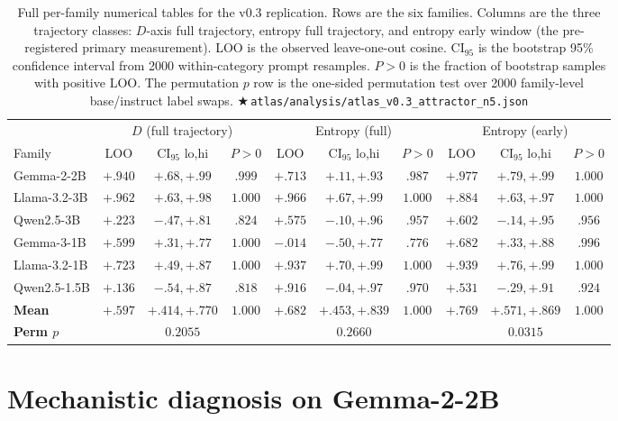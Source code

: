\documentclass[11pt,letterpaper]{article}
\newcommand{\repro}[1]{%
  \textcolor{fathomgreen}{\footnotesize$\bigstar$\,\texttt{#1}}}
\begin{document}
\begin{table}[h]
\centering
\scriptsize
\begin{tabular}{lccccccccc}
\toprule
 & \multicolumn{3}{c}{$D$ (full trajectory)} & \multicolumn{3}{c}{Entropy (full)} & \multicolumn{3}{c}{Entropy (early)} \\
\cmidrule(lr){2-4}\cmidrule(lr){5-7}\cmidrule(lr){8-10}
Family & LOO & CI$_{95}$ lo,hi & $P{>}0$ & LOO & CI$_{95}$ lo,hi & $P{>}0$ & LOO & CI$_{95}$ lo,hi & $P{>}0$ \\
\midrule
Gemma-2-2B   & $+.940$ & $+.68,+.99$ & $.999$ & $+.713$ & $+.11,+.93$ & $.987$ & $+.977$ & $+.79,+.99$ & $1.000$ \\
Llama-3.2-3B & $+.962$ & $+.63,+.98$ & $1.000$ & $+.966$ & $+.67,+.99$ & $1.000$ & $+.884$ & $+.63,+.97$ & $1.000$ \\
Qwen2.5-3B   & $+.223$ & $-.47,+.81$ & $.824$ & $+.575$ & $-.10,+.96$ & $.957$ & $+.602$ & $-.14,+.95$ & $.956$ \\
Gemma-3-1B   & $+.599$ & $+.31,+.77$ & $1.000$ & $-.014$ & $-.50,+.77$ & $.776$ & $+.682$ & $+.33,+.88$ & $.996$ \\
Llama-3.2-1B & $+.723$ & $+.49,+.87$ & $1.000$ & $+.937$ & $+.70,+.99$ & $1.000$ & $+.939$ & $+.76,+.99$ & $1.000$ \\
Qwen2.5-1.5B & $+.136$ & $-.54,+.87$ & $.818$ & $+.916$ & $-.04,+.97$ & $.970$ & $+.531$ & $-.29,+.91$ & $.924$ \\
\midrule
\textbf{Mean} & $\mathbf{+.597}$ & $+.414,+.770$ & $1.000$ & $\mathbf{+.682}$ & $+.453,+.839$ & $1.000$ & $\mathbf{+.769}$ & $+.571,+.869$ & $1.000$ \\
\textbf{Perm $p$} & & $0.2055$ & & & $0.2660$ & & & $\mathbf{0.0315}$ & \\
\bottomrule
\end{tabular}
\caption{Full per-family numerical tables for the v0.3 replication.
Rows are the six families. Columns are the three trajectory classes:
$D$-axis full trajectory, entropy full trajectory, and entropy early
window (the pre-registered primary measurement). LOO is the observed
leave-one-out cosine. CI$_{95}$ is the bootstrap 95\% confidence interval
from 2000 within-category prompt resamples. $P{>}0$ is the fraction of
bootstrap samples with positive LOO. The permutation $p$ row is the
one-sided permutation test over 2000 family-level base/instruct label
swaps. \repro{atlas/analysis/atlas\_v0.3\_attractor\_n5.json}}
\label{tab:app-full}
\end{table}

\section{Mechanistic diagnosis on Gemma-2-2B}
\label{app:diagnosis}
\end{document}
